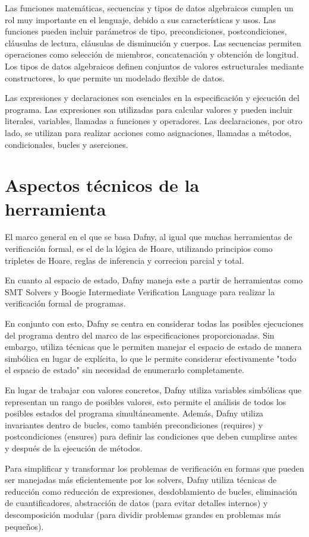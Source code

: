 \documentclass[runningheads]{llncs}
\begin{document}
Las funciones matemáticas, secuencias y tipos de datos algebraicos cumplen un rol muy importante en el lenguaje, debido a sus características y usos.
Las funciones pueden incluir parámetros de tipo, precondiciones, postcondiciones, cláusulas de lectura, cláusulas de disminución y cuerpos.
Las secuencias permiten operaciones como selección de miembros, concatenación y obtención de longitud.
Los tipos de datos algebraicos definen conjuntos de valores estructurales mediante constructores, lo que permite un modelado flexible de datos.

Las expresiones y declaraciones son esenciales en la especificación y ejecución del programa.
Las expresiones son utilizadas para calcular valores y pueden incluir literales, variables, llamadas a funciones y operadores.
Las declaraciones, por otro lado, se utilizan para realizar acciones como asignaciones, llamadas a métodos, condicionales, bucles y aserciones.

\section{Aspectos técnicos de la herramienta}
El marco general en el que se basa Dafny, al igual que muchas herramientas de verificación formal, es el de la lógica de Hoare,
utilizando principios como tripletes de Hoare, reglas de inferencia y correcion parcial y total.

En cuanto al espacio de estado, Dafny maneja este a partir de herramientas como SMT Solvers y Boogie Intermediate Verification Language
para realizar la verificación formal de programas.

En conjunto con esto, Dafny se centra en considerar todas las posibles ejecuciones del programa dentro del marco de las especificaciones proporcionadas. 
Sin embargo, utiliza técnicas que le permiten manejar el espacio de estado de manera simbólica en lugar de explícita, 
lo que le permite considerar efectivamente "todo el espacio de estado" sin necesidad de enumerarlo completamente.

En lugar de trabajar con valores concretos, Dafny utiliza variables simbólicas que representan un rango de posibles valores,
esto permite el análisis de todos los posibles estados del programa simultáneamente.
Además, Dafny utiliza invariantes dentro de bucles, como también precondiciones (requires) y postcondiciones (ensures) para definir las condiciones 
que deben cumplirse antes y después de la ejecución de métodos.

Para simplificar y transformar los problemas de verificación en formas que pueden ser manejadas más eficientemente por los solvers, 
Dafny utiliza técnicas de reducción como reducción de expresiones, desdoblamiento de bucles, eliminación de cuantificadores,
abstracción de datos (para evitar detalles internos) y descomposición modular (para dividir problemas grandes en problemas más pequeños).
\end{document}
